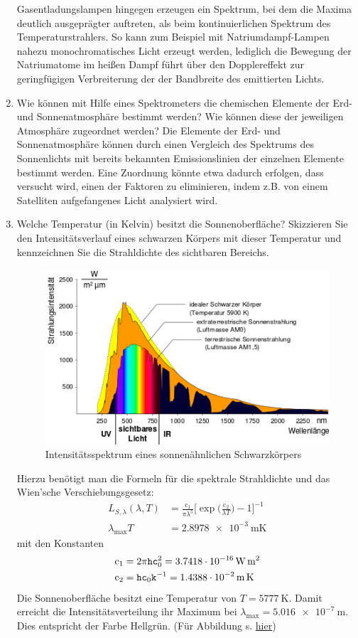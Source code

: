 \begin{enumerate}
		 Gasentladungslampen hingegen erzeugen ein Spektrum, bei dem die Maxima deutlich ausgeprägter auftreten, als beim kontinuierlichen Spektrum des Temperaturstrahlers. So kann zum Beispiel mit Natriumdampf-Lampen nahezu monochromatisches Licht erzeugt werden, lediglich die Bewegung der Natriumatome im heißen Dampf führt über den Dopplereffekt zur geringfügigen Verbreiterung der der Bandbreite des emittierten Lichts.
	\item Wie können mit Hilfe eines Spektrometers die chemischen Elemente der Erd- und Sonnenatmosphäre bestimmt werden? Wie können diese der jeweiligen Atmosphäre zugeordnet werden?
		\subitem Die Elemente der Erd- und Sonnenatmosphäre können durch einen Vergleich des Spektrums des Sonnenlichts mit bereits bekannten Emissionslinien der einzelnen Elemente bestimmt werden.
		Eine Zuordnung könnte etwa dadurch erfolgen, dass versucht wird, einen der Faktoren zu eliminieren, indem z.B. von einem Satelliten aufgefangenes Licht analysiert wird.
	\item Welche Temperatur (in Kelvin) besitzt die Sonnenoberfläche? Skizzieren Sie den Intensitätsverlauf eines schwarzen Körpers mit dieser Temperatur und kennzeichnen Sie die Strahldichte des sichtbaren Bereichs.
		\subitem \begin{figure}[!hbt]
			\centering
			\hypertarget{Abb1}{}
			\includegraphics{sunspectrum}
			\caption{Intensitätsspektrum eines sonnenähnlichen Schwarzkörpers}
			\label{fig:Abb1}
		\end{figure}
		Hierzu benötigt man die Formeln für die spektrale Strahldichte und das Wien'sche Verschiebungsgesetz:
		\begin{align}
			L_{S,\lambda}(\lambda,T)&=\frac{\mathrm{c}_1}{\pi\lambda^{5}}\Big[\exp\Big(\frac{\mathrm{c}_2}{\lambda T}\Big)-1\Big]^{-1}\label{1}\\
			\lambda_{\mathrm{max}}T&=\SI{2.8978e-3}{\meter\kelvin}\label{2}
		\end{align}
		mit den Konstanten 
		\begin{align*}
			\mathrm{c}_1&=2\pi\mathtt{h}\mathtt{c}_0^2=\SI{3.7418e-16}{\watt\meter\squared}\\
			\mathrm{c}_2&=\mathtt{h}\mathtt{c}_0\mathtt{k}^{-1}=\SI{1.4388e-2}{\meter\kelvin}
		\end{align*}
		Die Sonnenoberfläche besitzt eine Temperatur von $T=\SI{5777}{\kelvin}$. Damit erreicht die Intensitätsverteilung ihr Maximum bei $\lambda_{\mathrm{max}}=\SI{5.016e-7}{\meter}$. Dies entspricht der Farbe Hellgrün. (Für Abbildung s. \hyperlink{Abb1}{hier})
		

\end{enumerate}
